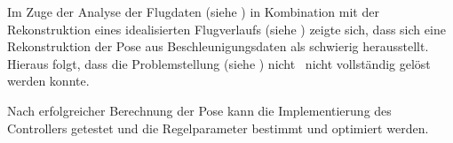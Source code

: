 
Im Zuge der Analyse der Flugdaten (siehe ) in Kombination mit der Rekonstruktion eines idealisierten Flugverlaufs (siehe ) zeigte sich, dass sich eine Rekonstruktion der Pose aus Beschleunigungsdaten als schwierig herausstellt.\\
Hieraus folgt, dass die Problemstellung (siehe ) nicht \bzw\ nicht vollständig gelöst werden konnte.

Nach erfolgreicher Berechnung der Pose kann die Implementierung des Controllers getestet und die Regelparameter bestimmt und optimiert werden.








